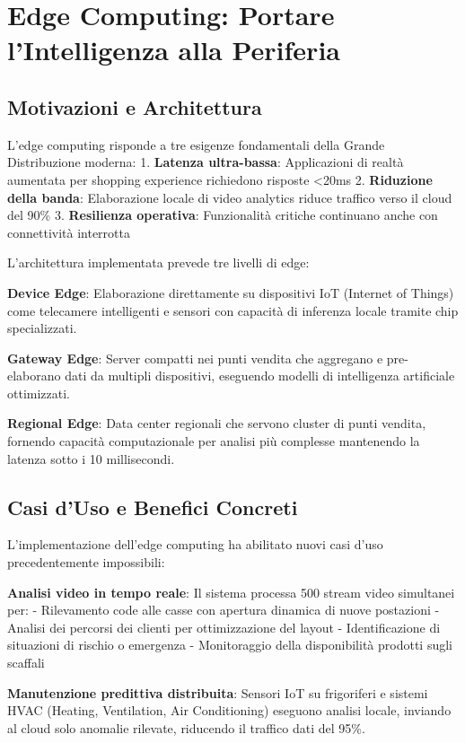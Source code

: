 \section{Edge Computing: Portare l'Intelligenza alla Periferia}

\subsection{Motivazioni e Architettura}

L'edge computing risponde a tre esigenze fondamentali della Grande Distribuzione moderna:
1. \textbf{Latenza ultra-bassa}: Applicazioni di realtà aumentata per shopping experience richiedono risposte <20ms
2. \textbf{Riduzione della banda}: Elaborazione locale di video analytics riduce traffico verso il cloud del 90\%
3. \textbf{Resilienza operativa}: Funzionalità critiche continuano anche con connettività interrotta

L'architettura implementata prevede tre livelli di edge:

\textbf{Device Edge}: Elaborazione direttamente su dispositivi IoT (Internet of Things) come telecamere intelligenti e sensori con capacità di inferenza locale tramite chip specializzati.

\textbf{Gateway Edge}: Server compatti nei punti vendita che aggregano e pre-elaborano dati da multipli dispositivi, eseguendo modelli di intelligenza artificiale ottimizzati.

\textbf{Regional Edge}: Data center regionali che servono cluster di punti vendita, fornendo capacità computazionale per analisi più complesse mantenendo la latenza sotto i 10 millisecondi.

\subsection{Casi d'Uso e Benefici Concreti}

L'implementazione dell'edge computing ha abilitato nuovi casi d'uso precedentemente impossibili:

\textbf{Analisi video in tempo reale}: Il sistema processa 500 stream video simultanei per:
- Rilevamento code alle casse con apertura dinamica di nuove postazioni
- Analisi dei percorsi dei clienti per ottimizzazione del layout
- Identificazione di situazioni di rischio o emergenza
- Monitoraggio della disponibilità prodotti sugli scaffali

\textbf{Manutenzione predittiva distribuita}: Sensori IoT su frigoriferi e sistemi HVAC (Heating, Ventilation, Air Conditioning) eseguono analisi locale, inviando al cloud solo anomalie rilevate, riducendo il traffico dati del 95\%.

